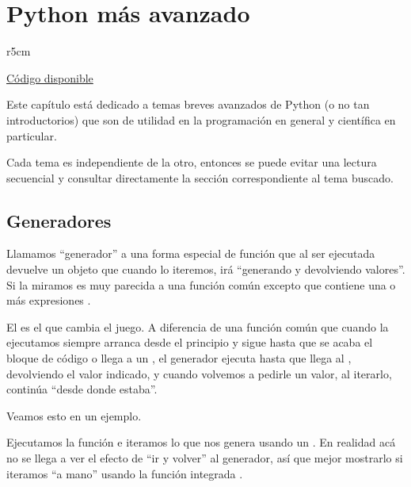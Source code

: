 

\chapter{Python más avanzado} \label{ch:nti}

\begin{wraptable}{r}{5cm}
\begin{modulesinfo}
\begin{center}
{\small
    \href{https://github.com/facundobatista/libro-pyciencia/tree/master/código/no_tan_intro/}{Código disponible}
}
\end{center}
\end{modulesinfo}
\end{wraptable}

Este capítulo está dedicado a temas breves avanzados de Python (o no tan introductorios) que son de utilidad en la programación en general y científica en particular.

Cada tema es independiente de la otro, entonces se puede evitar una lectura secuencial y consultar directamente la sección correspondiente al tema buscado.


\section{Generadores}

Llamamos ``generador'' a una forma especial de función que al ser ejecutada devuelve un objeto que cuando lo iteremos, irá ``generando y devolviendo valores''. Si la miramos es muy parecida a una función común excepto que contiene una o más expresiones . 

El  es el que cambia el juego. A diferencia de una función común que cuando la ejecutamos siempre arranca desde el principio y sigue hasta que se acaba el bloque de código o llega a un , el generador ejecuta hasta que llega al , devolviendo el valor indicado, y cuando volvemos a pedirle un valor, al iterarlo, continúa ``desde donde estaba''.

Veamos esto en un ejemplo.


Ejecutamos la función e iteramos lo que nos genera usando un . En realidad acá no se llega a ver el efecto de ``ir y volver'' al generador, así que mejor mostrarlo si iteramos ``a mano'' usando la función integrada .

